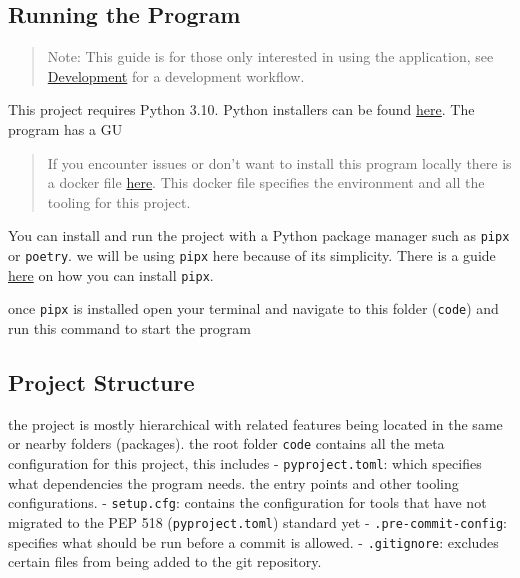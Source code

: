 \hypertarget{running-the-program}{%
\subsection{Running the Program}\label{running-the-program}}

\begin{quote}
Note: This guide is for those only interested in using the application,
see \protect\hyperlink{development}{Development} for a development
workflow.
\end{quote}

This project requires Python 3.10. Python installers can be found
\href{https://www.python.org/downloads/}{here}. The program has a GU

\begin{quote}
If you encounter issues or don't want to install this program locally
there is a docker file \href{../.devcontainer/Dockerfile}{here}. This
docker file specifies the environment and all the tooling for this
project.
\end{quote}

You can install and run the project with a Python package manager such
as \texttt{pipx} or \texttt{poetry}. we will be using \texttt{pipx} here
because of its simplicity. There is a guide
\href{https://pypa.github.io/pipx/installation/}{here} on how you can
install \texttt{pipx}.

once \texttt{pipx} is installed open your terminal and navigate to this
folder (\texttt{code}) and run this command to start the program

\begin{Shaded}
\begin{Highlighting}[]
\end{Highlighting}
\end{Shaded}

\hypertarget{project-structure}{%
\subsection{Project Structure}\label{project-structure}}

the project is mostly hierarchical with related features being located
in the same or nearby folders (packages). the root folder \texttt{code}
contains all the meta configuration for this project, this includes -
\texttt{pyproject.toml}: which specifies what dependencies the program
needs. the entry points and other tooling configurations. -
\texttt{setup.cfg}: contains the configuration for tools that have not
migrated to the PEP 518 (\texttt{pyproject.toml}) standard yet -
\texttt{.pre-commit-config}: specifies what should be run before a
commit is allowed. - \texttt{.gitignore}: excludes certain files from
being added to the git repository.

